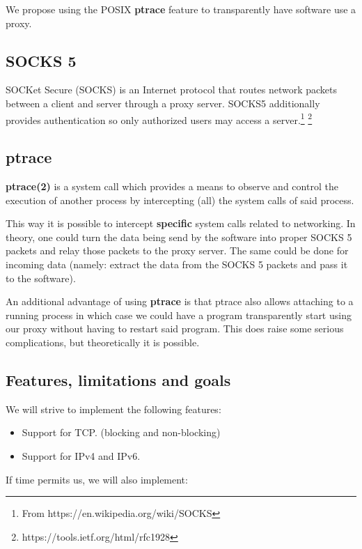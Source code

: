 \documentclass[a4paper]{article}
\begin{document}
We propose using the POSIX \textbf{ptrace} feature to transparently have
software use a proxy.

\subsection{SOCKS 5}

SOCKet Secure (SOCKS) is an Internet protocol that routes network packets
between a client and server through a proxy server. SOCKS5 additionally provides
authentication so only authorized users may access a server.\footnote{From
https://en.wikipedia.org/wiki/SOCKS} \footnote{https://tools.ietf.org/html/rfc1928}

\subsection{ptrace}

\textbf{ptrace(2)} is a system call which provides a means to observe and
control the execution of another process by intercepting (all) the system calls
of said process.

This way it is possible to intercept \textbf{specific} system calls related to
networking. In theory, one could turn the data being send by the software into
proper SOCKS 5 packets and relay those packets to the proxy server. The same
could be done for incoming data (namely: extract the data from the SOCKS 5
packets and pass it to the software).

An additional advantage of using \textbf{ptrace} is that ptrace also allows
attaching to a running process in which case we could have a program
transparently start using our proxy without having to restart said program. This
does raise some serious complications, but theoretically it is possible.

\subsection{Features, limitations and goals}

We will strive to implement the following features:

\begin{itemize}
\item Support for TCP. (blocking and non-blocking)
\item Support for IPv4 and IPv6.
\end{itemize}

If time permits us, we will also implement:
\end{document}
